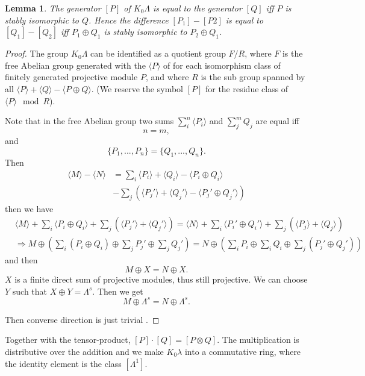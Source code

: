 \documentclass[11pt]{article}
\newtheorem{lemma}[thm]{Lemma}
\newcommand{\Lrta}{\Longrightarrow}
\newcommand{\lgl}{\langle}
\newcommand{\rgl}{\rangle}
\begin{document}
\begin{lemma}
The generator $[P]$ of $K_0\Lambda $ is equal to the generator $[Q]$ iff $P$ is stably isomorphic to $Q$. Hence the difference $[P_1]-[P2]$ is equal to $[Q_1]-[Q_2]$ iff $P_1\oplus Q_1$ is stably isomorphic to $P_2\oplus Q_1$.
\end{lemma}
\begin{proof}
The group $K_0\Lambda$ can be identified as a quotient group $F/R$, where $F$ is the free Abelian group generated with the $\langle P\rangle $ of for each isomorphism class of finitely generated projective module $P$, and where $R$ is the sub group spanned by all $\langle P\rangle+\langle Q\rangle-\langle P\oplus Q\rangle$. (We reserve the symbol $[P]$ for the residue class of $\langle P\rangle \mod R$).

Note that in the free Abelian group two sums $\sum_i^n \langle P_i\rangle$ and $\sum_{j}^m Q_j$ are equal iff 
$$
n=m,
$$
and 
$$
\{P_1,...,P_n\}=\{Q_1,...,Q_n\}.
$$
Then 
$$
\begin{aligned}
\langle M\rangle-\langle N\rangle &=\sum_i\lgl P_i\rgl+\lgl Q_i\rgl -\lgl P_i\oplus Q_i\rgl \\
&-\sum_j\left(\lgl P_j'\rgl+\lgl Q_j'\rgl-\lgl P_j'\oplus Q_j'\rgl\right)
\end{aligned}
$$
then we have 
$$
\begin{aligned}
&\langle M\rangle+\sum_i\lgl P_i\oplus Q_i\rgl+\sum_j(\lgl P_j'\rgl+\lgl Q_j'\rgl)=\langle N\rangle +\sum_i\lgl P_i'\oplus Q_i'\rgl+\sum_j(\lgl P_j\rgl+\lgl Q_j\rgl)\\
&\Lrta M\oplus \left(\sum_i (P_i\oplus Q_i)\oplus \sum _j P_j'\oplus \sum _j Q_j'\right)= N\oplus \left(\sum_i P_i\oplus \sum_i Q_i\oplus\sum_j(P_j'\oplus Q_j')\right)
\end{aligned}
$$
and then 
$$
M\oplus X=N\oplus X.
$$
$X$ is a finite direct sum  of projective modules, thus still projective. We can choose $Y$ such that $X\oplus Y=\Lambda^s$.
Then we get
$$
M\oplus \Lambda^s=N\oplus \Lambda^s.
$$

Then converse direction is just trivial .
\end{proof}
Together with the tensor-product, $[P]\cdot[Q]=[P\otimes Q]$. The multiplication is distributive over the addition and we make $K_0\lambda$ into a commutative ring, where the identity element is the class $[\Lambda^1]$.
\end{document}

